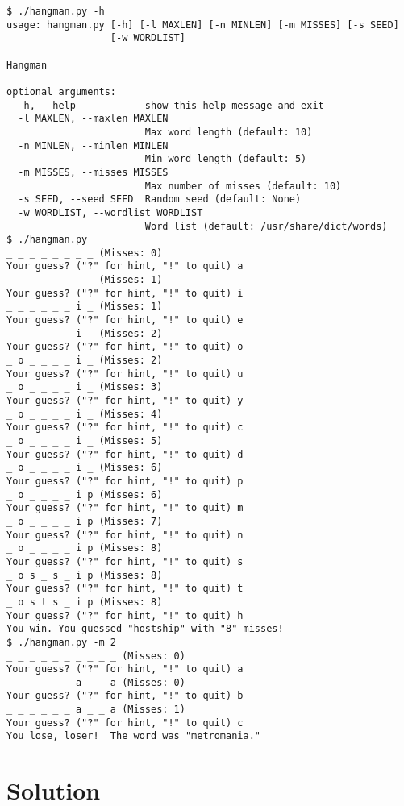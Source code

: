 \documentclass[]{article}
\begin{document}
\begin{verbatim}
$ ./hangman.py -h
usage: hangman.py [-h] [-l MAXLEN] [-n MINLEN] [-m MISSES] [-s SEED]
                  [-w WORDLIST]

Hangman

optional arguments:
  -h, --help            show this help message and exit
  -l MAXLEN, --maxlen MAXLEN
                        Max word length (default: 10)
  -n MINLEN, --minlen MINLEN
                        Min word length (default: 5)
  -m MISSES, --misses MISSES
                        Max number of misses (default: 10)
  -s SEED, --seed SEED  Random seed (default: None)
  -w WORDLIST, --wordlist WORDLIST
                        Word list (default: /usr/share/dict/words)
$ ./hangman.py
_ _ _ _ _ _ _ _ (Misses: 0)
Your guess? ("?" for hint, "!" to quit) a
_ _ _ _ _ _ _ _ (Misses: 1)
Your guess? ("?" for hint, "!" to quit) i
_ _ _ _ _ _ i _ (Misses: 1)
Your guess? ("?" for hint, "!" to quit) e
_ _ _ _ _ _ i _ (Misses: 2)
Your guess? ("?" for hint, "!" to quit) o
_ o _ _ _ _ i _ (Misses: 2)
Your guess? ("?" for hint, "!" to quit) u
_ o _ _ _ _ i _ (Misses: 3)
Your guess? ("?" for hint, "!" to quit) y
_ o _ _ _ _ i _ (Misses: 4)
Your guess? ("?" for hint, "!" to quit) c
_ o _ _ _ _ i _ (Misses: 5)
Your guess? ("?" for hint, "!" to quit) d
_ o _ _ _ _ i _ (Misses: 6)
Your guess? ("?" for hint, "!" to quit) p
_ o _ _ _ _ i p (Misses: 6)
Your guess? ("?" for hint, "!" to quit) m
_ o _ _ _ _ i p (Misses: 7)
Your guess? ("?" for hint, "!" to quit) n
_ o _ _ _ _ i p (Misses: 8)
Your guess? ("?" for hint, "!" to quit) s
_ o s _ s _ i p (Misses: 8)
Your guess? ("?" for hint, "!" to quit) t
_ o s t s _ i p (Misses: 8)
Your guess? ("?" for hint, "!" to quit) h
You win. You guessed "hostship" with "8" misses!
$ ./hangman.py -m 2
_ _ _ _ _ _ _ _ _ _ (Misses: 0)
Your guess? ("?" for hint, "!" to quit) a
_ _ _ _ _ _ a _ _ a (Misses: 0)
Your guess? ("?" for hint, "!" to quit) b
_ _ _ _ _ _ a _ _ a (Misses: 1)
Your guess? ("?" for hint, "!" to quit) c
You lose, loser!  The word was "metromania."
\end{verbatim}

\pagebreak

\hypertarget{solution-23}{%
\section{Solution}\label{solution-23}}
\end{document}
